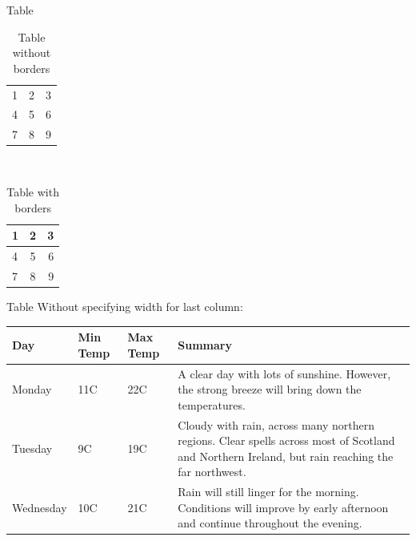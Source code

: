 \documentclass[10pt,times]{beamer}
\begin{document}
\begin{frame}{Table}
\begin{table}
\caption{Table without borders}
\begin{tabular}{ l c r }
  1 & 2 & 3 \\
  4 & 5 & 6 \\
  7 & 8 & 9 \\
\end{tabular}\\
\end{table}

\begin{table}
\caption{Table with borders}
\begin{tabular}{| l |c| r| } 
\hline
  1 & 2 & 3 \\ \hline
  4 & 5 & 6 \\ \hline
  7 & 8 & 9 \\ \hline
\end{tabular}
\end{table}
\end{frame}


\begin{frame}{Table}
Without specifying width for last column:
\begin{center}
    \begin{tabular}{| l | l | l | l |}
    \hline
    Day & Min Temp & Max Temp & Summary \\ \hline
    Monday & 11C & 22C & A clear day with lots of sunshine.
    However, the strong breeze will bring down the temperatures. \\ \hline
    Tuesday & 9C & 19C & Cloudy with rain, across many northern regions. Clear spells
    across most of Scotland and Northern Ireland,
    but rain reaching the far northwest. \\ \hline
    Wednesday & 10C & 21C & Rain will still linger for the morning.
    Conditions will improve by early afternoon and continue
    throughout the evening. \\
    \hline
    \end{tabular}
\end{center}
\end{frame}
\end{document}
